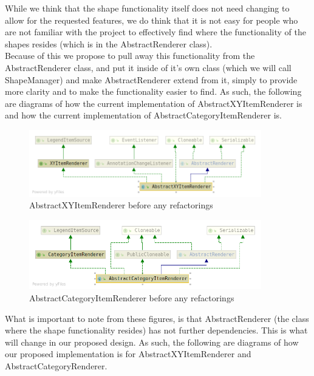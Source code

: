 \documentclass{article}
\begin{document}
While we think that the shape functionality itself does not need changing to allow for the requested features, we do think that it is not easy for people who are not familiar with the project to effectively find where the functionality of the shapes resides (which is in the AbstractRenderer class).\\

Because of this we propose to pull away this functionality from the AbstractRenderer class, and put it inside of it's own class (which we will call ShapeManager) and make AbstractRenderer extend from it, simply to provide more clarity and to make the functionality easier to find. As such, the following are diagrams of how the current implementation of AbstractXYItemRenderer is and how the current implementation of AbstractCategoryItemRenderer is.

\begin{figure}[H]
\centering
	\includegraphics[width=0.9\textwidth]{AbstractXYItemRendererBefore.png}
	\caption{AbstractXYItemRenderer before any refactorings}
\end{figure}

\begin{figure}[H]
\centering
	\includegraphics[width=0.9\textwidth]{AbstractCategoryItemRendererBefore.png}
	\caption{AbstractCategoryItemRenderer before any refactorings}
\end{figure}

What is important to note from these figures, is that AbstractRenderer (the class where the shape functionality resides) has not further dependencies. This is what will change in our proposed design.
As such, the following are diagrams of how our proposed implementation is for AbstractXYItemRenderer and AbstractCategoryRenderer.
\end{document}
